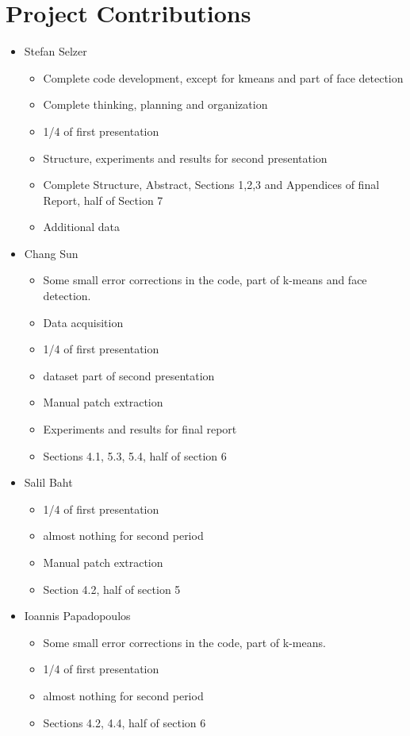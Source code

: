 \section{Project Contributions}

\begin{itemize}
	\item Stefan Selzer
	\begin{itemize}
	\item Complete code development, except for kmeans and part of face detection
	\item Complete thinking, planning and organization
	\item 1/4 of first presentation
	\item Structure, experiments and results for second presentation
	\item Complete Structure, Abstract, Sections 1,2,3 and Appendices of final Report, half of Section 7
	\item Additional data
	\end{itemize}
	\item Chang Sun
	\begin{itemize}
	\item Some small error corrections in the code, part of k-means and face detection.
	\item Data acquisition
	\item 1/4 of first presentation
	\item dataset part of second presentation
	\item Manual patch extraction
	\item Experiments and results for final report
	\item Sections 4.1, 5.3, 5.4, half of section 6
	\end{itemize}
	\item Salil Baht
	\begin{itemize}
	\item 1/4 of first presentation
	\item almost nothing for second period
	\item Manual patch extraction
	\item Section 4.2, half of section 5
	\end{itemize}
	\item Ioannis Papadopoulos
	\begin{itemize}
	\item Some small error corrections in the code, part of k-means.
	\item 1/4 of first presentation
	\item almost nothing for second period
	\item Sections 4.2, 4.4, half of section 6
	\end{itemize}
\end{itemize}
